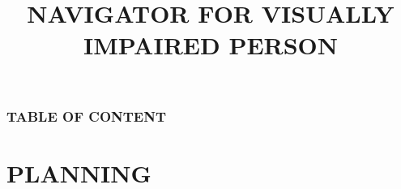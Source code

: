 \documentclass[
	11pt, %
	aspectratio=169, %
]{beamer}
\title[Short Title]{NAVIGATOR FOR VISUALLY IMPAIRED PERSON} %
\author[]{
\bigskip
\newline
\text{\textbf{Guide:}}
\newline
\text{ Prof. S.S. Patil}
\bigskip
\newline
\text{ \textbf{Students:}}
\newline
\text{Nikhil Kanitkar (23)}
\newline
\text{Dewoo Kudtarkar (27)}
\newline
\text{Mandar Naik (40)}
\newline
\text{Pranit Patil (48)}
} %
\date[\today]{} %
\begin{document}

\begin{frame}
	\titlepage %
\end{frame}



\begin{frame}
	\frametitle{TABLE OF CONTENT} %
	
	\tableofcontents %
\end{frame}


\section{PLANNING} %
\end{document}
